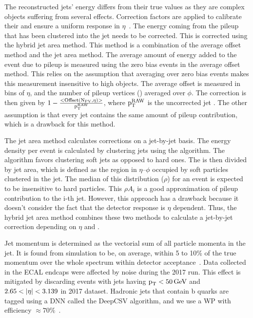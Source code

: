 The reconstructed jets' energy differs from their true values as they are complex objects suffering from several effects. Correction factors are applied to calibrate their \pt and ensure a uniform response in $\eta$~\cite{Chatrchyan:2011ds, Khachatryan:2016kdb}. The energy coming from the pileup that has been clustered into the jet needs to be corrected. This is corrected using the hybrid jet area method. This method is a combination of the average offset method and the jet area method. The average amount of energy added to the event due to pileup is measured using the zero bias events in the average offset method. This relies on the assumption that averaging over zero bias events makes this measurement insensitive to high \pt objects. The average offset is measured in bins of $\eta$, and the number of pileup vertices (\npv) averaged over $\phi$. The correction is then given by $1-\frac{<\text{Offset}(\text{N}_{\text{PV}},\eta)>}{\text{p}_\text{T}^{\text{RAW}}}$, where $\text{p}_\text{T}^{\text{RAW}}$ is the uncorrected jet \pt. The other assumption is that every jet contains the same amount of pileup contribution, which is a drawback for this method.

The jet area method calculates corrections on a jet-by-jet basis. The energy density per event is calculated by clustering jets using the \kt algorithm. The \kt algorithm favors clustering soft jets as opposed to hard ones. The \pt is then divided by jet area, which is defined as the region in $\eta$--$\phi$ occupied by soft particles clustered in the jet. The median of this distribution ($\rho$) for an event is expected to be insensitive to hard particles. This $\rho A_{i}$ is a good approximation of pileup contribution to the i-th jet. However, this approach has a drawback because it doesn't consider the fact that the detector response is $\eta$ dependent. Thus, the hybrid jet area method combines these two methods to calculate a jet-by-jet correction depending on $\eta$ and \npv.

Jet momentum is determined as the vectorial sum of all particle momenta in the jet. It is found from simulation to be, on average, within 5 to 10\% of the true momentum over the whole \pt spectrum within detector acceptance~\cite{CMS:2017wyc}. Data collected in the ECAL endcaps were affected by noise during the 2017 run. This effect is mitigated by discarding events with jets having $\text{p}_\text{T} < 50 \,\text{Ge\hspace{-.08em}V}$ and $2.65 < \lvert\eta\rvert < 3.139$ in 2017 dataset. Hadronic jets that contain b quarks are tagged using a DNN called the DeepCSV algorithm, and we use a WP with efficiency $\approx 70\%$~\cite{Sirunyan:2017ezt}.

